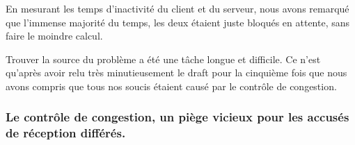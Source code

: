 \vspace{0.5cm}

En mesurant les temps d'inactivité du client et du serveur, nous avons remarqué que l'immense majorité du temps, les deux étaient juste bloqués en attente, sans faire le moindre calcul.

Trouver la source du problème a été une tâche longue et difficile. Ce n'est qu'après avoir relu très minutieusement le draft pour la cinquième fois que nous avons compris que tous nos soucis étaient causé par le contrôle de congestion.

\subsubsection{Le contrôle de congestion, un piège vicieux pour les accusés de réception différés.}

